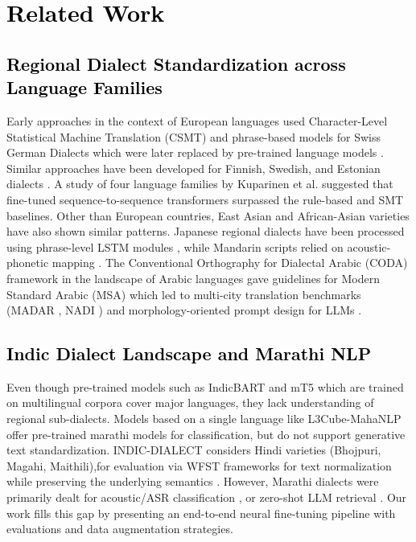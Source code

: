 \section{\textcolor{black}{Related Work}}
\label{sec:related}

\subsection{\textcolor{black}{Regional Dialect Standardization across Language Families}}
Early approaches in the context of European languages used Character-Level Statistical Machine Translation (CSMT) and phrase-based models for Swiss German Dialects \cite{scherrer2016swiss} which were later replaced by pre-trained language models \cite{lusetti2018impact,kresic2024normalizing}.
Similar approaches have been developed for Finnish, Swedish, and Estonian dialects \cite{partanen2019dialect,hamalainen2020normalizing,hamalainen2022generating}. 
A study of four language families by Kuparinen et al. \cite{kuparinen2023dialect} suggested that fine-tuned sequence-to-sequence transformers surpassed the rule-based and SMT baselines.
Other than European countries, East Asian and African-Asian varieties have also shown similar patterns. 
Japanese regional dialects have been processed using phrase-level LSTM modules \cite{abe2018multi}, while Mandarin scripts relied on acoustic-phonetic mapping \cite{zhao2022mandarin}. 
The Conventional Orthography for Dialectal Arabic (CODA) framework \cite{habash2012coda}in the landscape of Arabic languages gave guidelines for Modern Standard Arabic (MSA) which led to multi-city translation benchmarks (MADAR \cite{bouamor2018madar}, NADI \cite{abdulmageed2023nadi}) and morphology-oriented prompt design for LLMs \cite{eryani2020arabic,dimakis2025dialect}.

\subsection{\textcolor{black}{Indic Dialect Landscape and Marathi NLP}}


Even though pre-trained models such as IndicBART \cite{dabre2022indicbart} and mT5 \cite{xue2021mt5}which are trained on multilingual corpora cover major languages, they lack understanding of regional sub-dialects.
Models based on a single language like L3Cube-MahaNLP \cite{joshi2022l3cube} offer pre-trained marathi models for classification, but do not support generative text standardization.
INDIC-DIALECT \cite{kumar2024indicdialect} considers Hindi varieties (Bhojpuri, Magahi, Maithili),for evaluation via  WFST frameworks for text normalization while preserving the underlying semantics \cite{pratap2024wfst}. 
However, Marathi dialects were primarily dealt for acoustic/ASR classification \cite{mulla2022text,pawar2026automatic}, or zero-shot LLM retrieval \cite{gaikwad2025marathi,vyavhare2026marathi}. 
Our work fills this gap by presenting an end-to-end neural fine-tuning pipeline with evaluations and data augmentation strategies.

